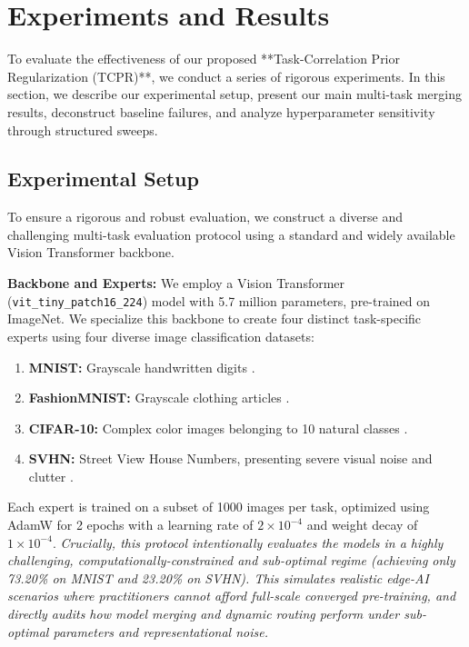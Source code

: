 \section{Experiments and Results}
\label{sec:experiments}

To evaluate the effectiveness of our proposed **Task-Correlation Prior Regularization (TCPR)**, we conduct a series of rigorous experiments. In this section, we describe our experimental setup, present our main multi-task merging results, deconstruct baseline failures, and analyze hyperparameter sensitivity through structured sweeps.

\subsection{Experimental Setup}
To ensure a rigorous and robust evaluation, we construct a diverse and challenging multi-task evaluation protocol using a standard and widely available Vision Transformer backbone.

\textbf{Backbone and Experts:} We employ a Vision Transformer (\texttt{vit\_tiny\_patch16\_224}) model \cite{dosovitskiy2020vit} with 5.7 million parameters, pre-trained on ImageNet. We specialize this backbone to create four distinct task-specific experts using four diverse image classification datasets:
\begin{enumerate}
    \item \textbf{MNIST:} Grayscale handwritten digits \cite{lecun1998mnist}.
    \item \textbf{FashionMNIST:} Grayscale clothing articles \cite{xiao2017fashion}.
    \item \textbf{CIFAR-10:} Complex color images belonging to 10 natural classes \cite{krizhevsky2009cifar}.
    \item \textbf{SVHN:} Street View House Numbers, presenting severe visual noise and clutter \cite{netzer2011svhn}.
\end{enumerate}
Each expert is trained on a subset of 1000 images per task, optimized using AdamW for 2 epochs with a learning rate of $2 \times 10^{-4}$ and weight decay of $1 \times 10^{-4}$. \textit{Crucially, this protocol intentionally evaluates the models in a highly challenging, computationally-constrained and sub-optimal regime (achieving only 73.20\% on MNIST and 23.20\% on SVHN). This simulates realistic edge-AI scenarios where practitioners cannot afford full-scale converged pre-training, and directly audits how model merging and dynamic routing perform under sub-optimal parameters and representational noise.}

